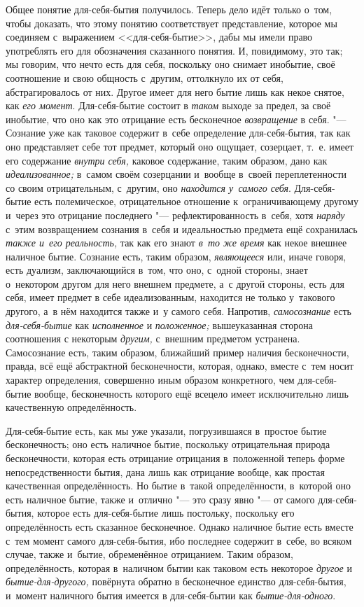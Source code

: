 Общее понятие для-себя-бытия получилось. Теперь дело идёт только о~том,
чтобы доказать, что этому понятию соответствует представление, которое мы
соединяем с~выражением <<для-себя-бытие>>, дабы мы имели право употреблять
его для обозначения сказанного понятия. И, повидимому, это так; мы говорим,
что нечто есть для себя, поскольку оно снимает инобытие, своё соотношение и
свою общность с~другим, оттолкнуло их от себя, абстрагировалось от них.
Другое имеет для него бытие лишь как некое снятое, как
{\em его момент}. Для-себя-бытие состоит в
{\em таком} выходе за предел, за своё инобытие, что оно
как это отрицание есть бесконечное {\em возвращение} в
себя. "--- Сознание уже как таковое содержит в~себе определение
для-себя-бытия, так как оно представляет себе тот предмет, который оно
ощущает, созерцает, т.~е. имеет его содержание
{\em внутри себя,} каковое содержание, таким образом,
дано как {\em идеализованное;} в~самом своём созерцании
и~вообще в~своей переплетенности со своим отрицательным, с~другим, оно
{\em находится у~самого себя}. Для-себя-бытие есть
полемическое, отрицательное отношение к~ограничивающему другому и~через это
отрицание последнего "--- рефлектированность в~себя, хотя
{\em наряду} с~этим возвращением сознания в~себя и
идеальностью предмета ещё сохранилась {\em также и~его
реальность,} так как его знают {\em в~то же время} как
некое внешнее наличное бытие. Сознание есть, таким образом,
{\em являющееся} или, иначе говоря, есть дуализм,
заключающийся в~том, что оно, с~одной стороны, знает о~некотором другом для
него внешнем предмете, а~с другой стороны, есть для себя, имеет предмет в
себе идеализованным, находится не только у~такового другого, а~в нём
находится также и~у самого себя. Напротив, {\em самосознание} есть
{\em для-себя-бытие} как {\em исполненное} и
{\em положенное;} вышеуказанная сторона соотношения с
некоторым {\em другим,} с~внешним предметом устранена.
Самосознание есть, таким образом, ближайший пример наличия бесконечности,
правда, всё ещё абстрактной бесконечности, которая, однако, вместе с~тем
носит характер определения, совершенно иным образом конкретного, чем
для-себя-бытие вообще, бесконечность которого ещё всецело имеет
исключительно лишь качественную определённость.


Для-себя-бытие есть, как мы уже указали, погрузившаяся в~простое бытие
бесконечность; оно есть наличное бытие, поскольку отрицательная природа
бесконечности, которая есть отрицание отрицания в~положенной теперь форме
непосредственности бытия, дана лишь как отрицание вообще, как простая
качественная определённость. Но бытие в~такой определённости, в~которой оно
есть наличное бытие, также и~отлично "--- это сразу явно "--- от самого
для-себя-бытия, которое есть для-себя-бытие лишь постольку, поскольку его
определённость есть сказанное бесконечное. Однако наличное бытие есть
вместе с~тем момент самого для-себя-бытия, ибо последнее содержит в~себе,
во всяком случае, также и~бытие, обременённое отрицанием. Таким образом,
определённость, которая в~наличном бытии как таковом есть некоторое
{\em другое} и {\em бытие-для-другого,} повёрнута обратно в
бесконечное единство для-себя-бытия, и~момент наличного бытия имеется в
для-себя-бытии как {\em бытие-для-одного}.

